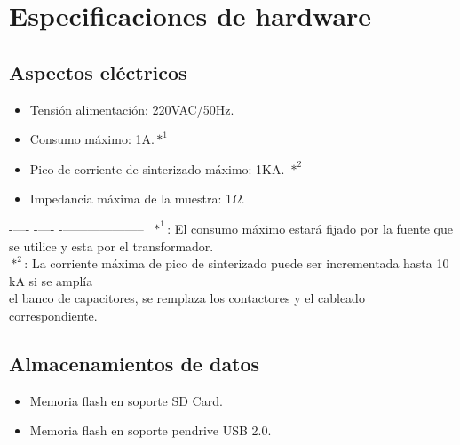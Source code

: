 \documentclass[12pt]{article}
\begin{document}
  \newpage
  
  \thispagestyle{empty} \tableofcontents \thispagestyle{empty} %

  \newpage
  \setcounter{page}{1}

  
  \section{Especificaciones de hardware}

    \subsection{Aspectos eléctricos}
      \begin{itemize}
	\item Tensión alimentación: 220VAC/50Hz.
	\item Consumo máximo: 1A.$*^{1}$
	\item Pico de corriente de sinterizado máximo: 1KA. $*^{2}$
	\item Impedancia máxima de la muestra: 1$\Omega$. 
	\end{itemize}
     
    \begin{tabbing}
      \= ----- \= ----- \= --------------------- \= \kill
      \> $*^{1}$:\>	El consumo máximo estará fijado por la fuente que se utilice y esta por el transformador. \\
      \> $*^{2}$:\>	La corriente máxima de pico de sinterizado puede ser incrementada hasta 10 kA si se amplía\\
         	\>\>	el banco de capacitores, se remplaza los contactores y el cableado correspondiente.\\
     \end{tabbing}

    \subsection{Almacenamientos de datos}
      
      \begin{itemize}
	\item Memoria flash en soporte SD Card.
	\item Memoria flash en soporte pendrive USB 2.0.
      \end{itemize}
\end{document}

